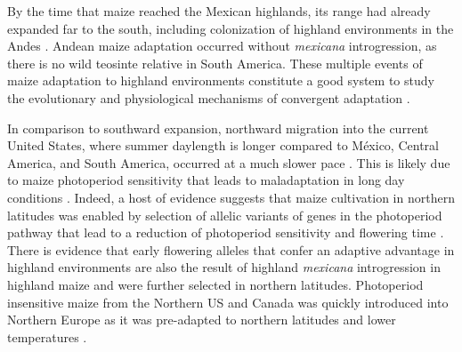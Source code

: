 \documentclass[9pt,twocolumn,twoside,lineno]{BioRxiv}
\begin{document}
By the time that maize reached the Mexican highlands, its range had already expanded far to the south, including colonization of highland environments in the  Andes \cite{Athens2016-ep, Grobman2012-pm}. 
Andean maize adaptation occurred without \textit{mexicana} introgression, as there is no wild teosinte relative in South America.
These multiple events of maize adaptation to highland environments constitute a good system to study the evolutionary and physiological mechanisms of convergent adaptation \cite{Takuno2015-uj, Wang2020-mp}.

In comparison to southward expansion, northward migration into the current United States, where summer daylength is longer compared to México, Central America, and South America, occurred at a much slower pace \cite{Da_Fonseca2015-zh, Swarts2017-ge}. 
This is likely due to maize photoperiod sensitivity that leads to maladaptation in long day conditions \cite{Hung2012-ms}. 
Indeed, a host of evidence suggests that maize cultivation in northern latitudes was enabled by selection of allelic variants of genes in the photoperiod pathway that lead to a reduction of photoperiod sensitivity and flowering time \cite{Liang2018-af, Guo2018-on, Coles2010-db, Huang2018-ga, Yang2013-lg, Salvi2007-ku, Hung2012-ms}.
There is evidence that early flowering alleles that confer an adaptive advantage in highland environments are also the result of highland \textit{mexicana} introgression in highland maize \cite{Guo2018-on} and were further selected in northern latitudes.
Photoperiod insensitive maize from the Northern US and Canada was quickly introduced into Northern Europe as it was pre-adapted to northern latitudes and lower temperatures \cite{Brandenburg2017-ii}.
\end{document}
